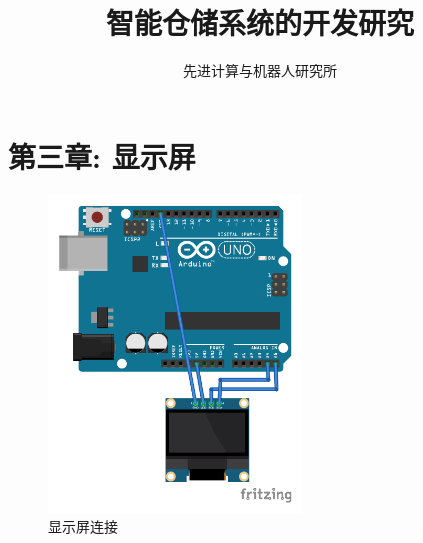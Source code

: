 \documentclass{article}
\newcommand{\xiaosihao}{\fontsize{12pt}{\baselineskip}\selectfont}
\begin{document}
	
\newtheorem{example}{例}             %
\newtheorem{algorithm}{算法}
\newtheorem{theorem}{定理}[section]  %
\newtheorem{definition}{定义}
\newtheorem{axiom}{公理}
\newtheorem{property}{性质}
\newtheorem{proposition}{命题}
\newtheorem{lemma}{引理}
\newtheorem{corollary}{推论}
\newtheorem{remark}{注解}
\newtheorem{condition}{条件}
\newtheorem{conclusion}{结论}
\newtheorem{assumption}{假设}

\renewcommand{\contentsname}{目录}  %
\renewcommand{\abstractname}{摘要}  %
\renewcommand{\refname}{参考文献}   %
\renewcommand{\indexname}{索引}
\renewcommand{\figurename}{图}
\renewcommand{\tablename}{表}
\renewcommand{\appendixname}{附录}
\renewcommand{\algorithm}{算法}	

\title{智能仓储系统的开发研究}
\author{\xiaosihao 先进计算与机器人研究所}
		
\maketitle
		
\tableofcontents
\newpage

\section{第三章: 显示屏}
\begin{figure}[h]
	\centering
	\includegraphics[width=0.6\textwidth]{../Picture/OLED.pdf}
	\caption{显示屏连接}
	\label{fig:显示屏连接}
	\hfill
\end{figure}
\end{document}
